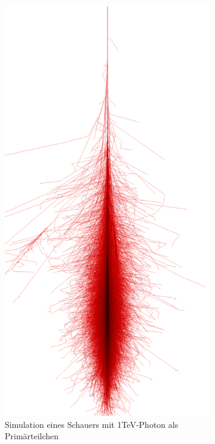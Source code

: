 \begin{figure}
 \begin{subfigure}{0.5\linewidth}
  \includegraphics[width=0.7\linewidth]{./Plots/Photon_1TeV_CORSIKA.png}
  \caption{Simulation eines Schauers mit 1TeV-Photon als Primärteilchen}
 \end{subfigure}
 \hspace{0.5cm}
  \begin{subfigure}{0.5\linewidth}

\end{subfigure}
\end{figure}

